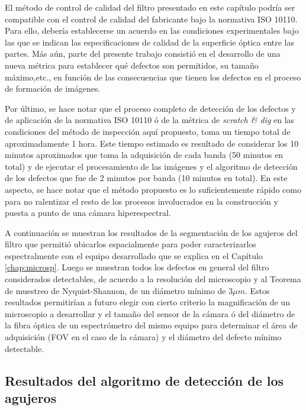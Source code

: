 El método de control de calidad del filtro presentado en este capítulo podría ser compatible con el control de calidad del fabricante bajo la normativa ISO 10110. Para ello, debería establecerse un acuerdo en las condiciones experimentales bajo las que se indican las especificaciones de calidad de la superficie óptica entre las partes. Más aún, parte del presente trabajo consistió en el desarrollo de una nueva métrica para establecer qué defectos son permitidos, su tamaño máximo,etc., en función de las consecuencias que tienen los defectos en el proceso de formación de imágenes.

Por último, se hace notar que el proceso completo de detección de los defectos y de aplicación de la normativa ISO 10110 ó de la métrica de \textit{scratch \& dig} en las condiciones del método de inspección aquí propuesto, toma un tiempo total de aproximadamente 1 hora. Este tiempo estimado es resultado de considerar los 10 minutos aproximados que toma la adquisición de cada banda (50 minutos en total) y de ejecutar el procesamiento de las imágenes y el algoritmo de detección de los defectos que fue de 2 minutos por banda (10 minutos en total). En este aspecto, se hace notar que el método propuesto es lo suficientemente rápido como para no ralentizar el resto de los procesos involucrados en la construcción y puesta a punto de una cámara hiperespectral.

A continuación se muestran los resultados de la segmentación de los agujeros del filtro que permitió ubicarlos espacialmente para poder caracterizarlos espectralmente con el equipo desarrollado que se explica en el Capítulo \ref{chap:microsp}. Luego se muestran todos los defectos en general del filtro considerados detectables, de acuerdo a la resolución del microscopio y al Teorema de muestreo de Nyquist-Shannon, de un diámetro mínimo de $3 \mu m$. Estos resultados permitirían a futuro elegir con cierto criterio la magnificación de un microscopio a desarrollar y el tamaño del sensor de la cámara ó del diámetro de la fibra óptica de un espectrómetro del mismo equipo para determinar el área de adquisición (FOV en el caso de la cámara) y el diámetro del defecto mínimo detectable.

\singlespacing
\subsection{Resultados del algoritmo de detección de los agujeros}
\label{sec:aguj}

